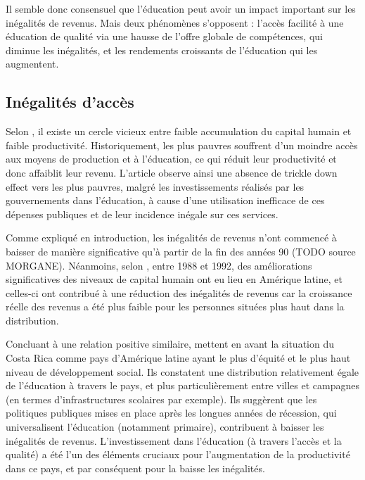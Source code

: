 \documentclass[pagesize, twoside=off, bibliography=totoc, DIV=calc, fontsize=12pt, a4paper, french]{scrartcl}
\begin{document}
Il semble donc consensuel que l’éducation peut avoir un impact important sur les inégalités de revenus. Mais deux phénomènes s’opposent : l’accès facilité à une éducation de qualité via une hausse de l’offre globale de compétences, qui diminue les inégalités, et les rendements croissants de l’éducation qui les augmentent.

\subsection{Inégalités d’accès}

Selon \citet{birdsall_education_1998}, il existe un cercle vicieux entre faible accumulation du capital humain et faible productivité. Historiquement, les plus pauvres souffrent d’un moindre accès aux moyens de production et à l'éducation, ce qui réduit leur productivité et donc affaiblit leur revenu. L’article observe ainsi une absence de \og{}trickle down effect\fg{} vers les plus pauvres, malgré les investissements réalisés par les gouvernements dans l’éducation, à cause d’une utilisation inefficace de ces dépenses publiques et de leur incidence inégale sur ces services.

Comme expliqué en introduction, les inégalités de revenus n’ont commencé à baisser de manière significative qu’à partir de la fin des années 90 (TODO source MORGANE). Néanmoins, selon \citet{arabsheibani_changes_2006}, entre 1988 et 1992, des améliorations significatives des niveaux de capital humain ont eu lieu en Amérique latine, et celles-ci ont contribué à une réduction des inégalités de revenus car  la croissance réelle des revenus a été plus faible pour les personnes situées plus haut dans la distribution.

Concluant à une relation positive similaire, \citet{trejos_inequality_2004} mettent en avant la situation du Costa Rica comme pays d’Amérique latine ayant le plus d’équité et le plus haut niveau de développement social. Ils constatent une distribution relativement égale de l’éducation à travers le pays, et plus particulièrement entre villes et campagnes (en termes d’infrastructures scolaires par exemple). Ils suggèrent que les politiques publiques mises en place après les longues années de récession, qui universalisent l’éducation (notamment primaire), contribuent à baisser les inégalités de revenus. L’investissement dans l’éducation (à travers l’accès et la qualité) a été l’un des éléments cruciaux pour l’augmentation de la productivité dans ce pays, et par conséquent  pour la baisse les inégalités. 
\end{document}
